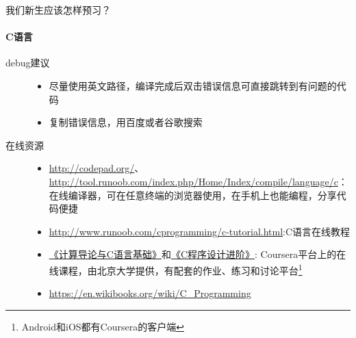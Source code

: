 \documentclass{beamer}
\begin{document}
\begin{frame}{我们新生应该怎样预习？}
\framesubtitle{C语言}
\begin{description}
    \item[debug建议\faCommentingO]
    \begin{itemize}
    \item 尽量使用英文路径，编译完成后双击错误信息可直接跳转到有问题的代码
    \item 复制错误信息，用百度或者谷歌搜索
    \end{itemize}
    \item[在线资源\faExternalLink] \begin{itemize}
    \item \faLink\url{http://codepad.org/}、\faLink\url{http://tool.runoob.com/index.php/Home/Index/compile/language/c}：在线编译器，可在任意终端的浏览器使用，在手机上也能编程，分享代码便捷
    \item \faLink\url{http://www.runoob.com/cprogramming/c-tutorial.html}:C语言在线教程
    \item \href{https://www.coursera.org/learn/jisuanji-biancheng}{《计算导论与C语言基础》}和\href{https://www.coursera.org/learn/c-chengxu-sheji}{《C程序设计进阶》}: Coursera平台上的在线课程，由北京大学提供，有配套的作业、练习和讨论平台\footnote{Android和iOS都有Coursera的客户端}
    \item \faLink\url{https://en.wikibooks.org/wiki/C_Programming}
    \end{itemize}
\end{description}
\end{frame}
\end{document}
